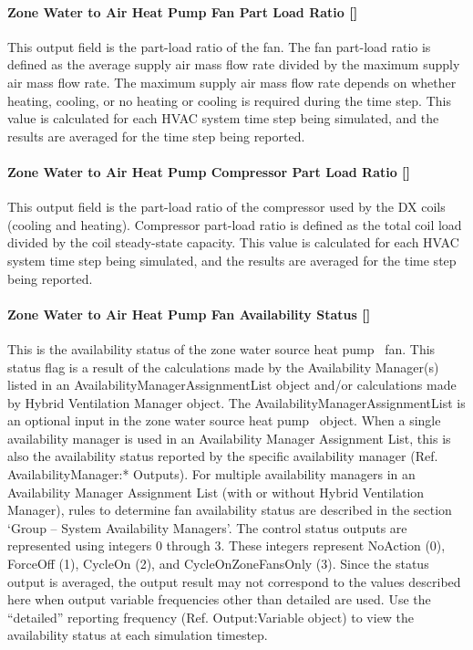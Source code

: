 \paragraph{Zone Water to Air Heat Pump Fan Part Load Ratio {[]}}\label{zone-water-to-air-heat-pump-fan-part-load-ratio}

This output field is the part-load ratio of the fan. The fan part-load ratio is defined as the average supply air mass flow rate divided by the maximum supply air mass flow rate. The maximum supply air mass flow rate depends on whether heating, cooling, or no heating or cooling is required during the time step. This value is calculated for each HVAC system time step being simulated, and the results are averaged for the time step being reported.

\paragraph{Zone Water to Air Heat Pump Compressor Part Load Ratio {[]}}\label{zone-water-to-air-heat-pump-compressor-part-load-ratio}

This output field is the part-load ratio of the compressor used by the DX coils (cooling and heating). Compressor part-load ratio is defined as the total coil load divided by the coil steady-state capacity. This value is calculated for each HVAC system time step being simulated, and the results are averaged for the time step being reported.

\paragraph{Zone Water to Air Heat Pump Fan Availability Status {[]}}\label{zone-water-to-air-heat-pump-fan-availability-status}

This is the availability status of the zone water source heat pump~ fan. This status flag is a result of the calculations made by the Availability Manager(s) listed in an AvailabilityManagerAssignmentList object and/or calculations made by Hybrid Ventilation Manager object. The AvailabilityManagerAssignmentList is an optional input in the zone water source heat pump~ object. When a single availability manager is used in an Availability Manager Assignment List, this is also the availability status reported by the specific availability manager (Ref. AvailabilityManager:* Outputs). For multiple availability managers in an Availability Manager Assignment List (with or without Hybrid Ventilation Manager), rules to determine fan availability status are described in the section `Group -- System Availability Managers'. The control status outputs are represented using integers 0 through 3. These integers represent NoAction (0), ForceOff (1), CycleOn (2), and CycleOnZoneFansOnly (3). Since the status output is averaged, the output result may not correspond to the values described here when output variable frequencies other than detailed are used. Use the ``detailed'' reporting frequency (Ref. Output:Variable object) to view the availability status at each simulation timestep.

